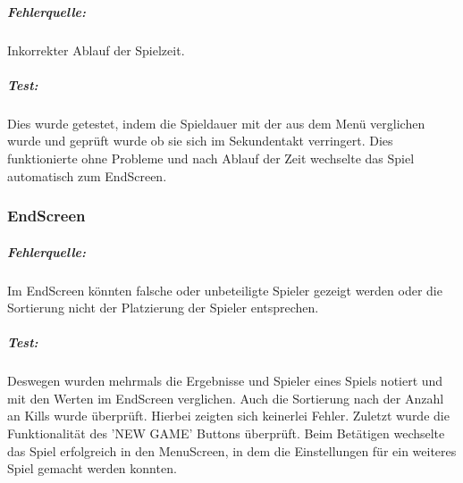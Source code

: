\documentclass[a4paper]{scrreprt}
\begin{document}
\subparagraph*{Fehlerquelle:}
Inkorrekter Ablauf der Spielzeit.
\subparagraph*{Test:}
Dies wurde getestet, indem die Spieldauer mit der aus dem Menü verglichen wurde und geprüft wurde ob sie sich im Sekundentakt verringert. Dies funktionierte ohne Probleme und nach Ablauf der Zeit wechselte das Spiel automatisch zum EndScreen.
		
\subsubsection*{EndScreen}
\subparagraph*{Fehlerquelle:}
Im EndScreen könnten falsche oder unbeteiligte Spieler gezeigt werden oder die Sortierung nicht der Platzierung der Spieler entsprechen. 
\subparagraph*{Test:}
Deswegen wurden mehrmals die Ergebnisse und Spieler eines Spiels notiert und mit den Werten im EndScreen verglichen. Auch die Sortierung nach der Anzahl an Kills wurde überprüft. Hierbei zeigten sich keinerlei Fehler. Zuletzt wurde die Funktionalität des 'NEW GAME' Buttons überprüft. Beim Betätigen wechselte das Spiel erfolgreich in den MenuScreen, in dem die Einstellungen für ein weiteres Spiel gemacht werden konnten.
\end{document}
